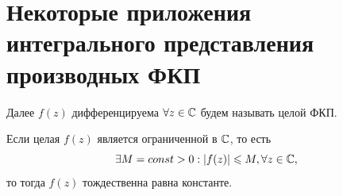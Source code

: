 \documentclass[../../main.tex]{subfiles}
\begin{document}
    \section{Некоторые приложения интегрального
    представления производных ФКП}
    
    Далее $f(z)$ дифференцируема $\forall z \in \mathbb{C}$
    будем называть целой ФКП.
    \begin{thm}[kek]
     Если целая $f(z)$ является ограниченной в $\mathbb{C}$,
     то есть
     \begin{equation}
     \label{lec33:11}
      \exists M = const > 0 : \left|{f(z)}\right|
     \leqslant M, \forall z \in \mathbb{C}, 
     \end{equation}
     то тогда $f(z)$ тождественна равна константе.

    \end{thm}
\end{document}
